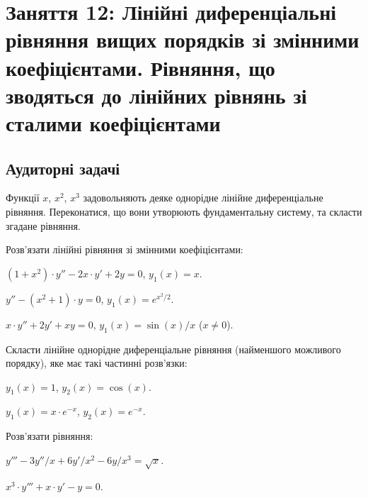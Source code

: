 \section*{Заняття 12: Лінійні диференціальні рівняння вищих порядків зі змінними коефіцієнтами. Рівняння, що зводяться до лінійних рівнянь зі сталими коефіцієнтами}

\subsection*{Аудиторні задачі}

\begin{problem}
	Функції $x$, $x^2$, $x^3$ задовольняють деяке однорідне лінійне диференціальне рівняння. Переконатися, що вони утворюють фундаментальну систему, та скласти згадане рівняння.
\end{problem}

Розв'язати лінійні рівняння зі змінними коефіцієнтами:

\begin{problem}
	$(1 + x^2) \cdot y'' - 2 x \cdot y' + 2 y = 0$, $y_1(x) = x$.
\end{problem}

\begin{problem}
	$y'' - (x^2 + 1) \cdot y = 0$, $y_1(x) = e^{x^2 / 2}$.
\end{problem}

\begin{problem}
	$x \cdot y'' + 2 y' + x y = 0$, $y_1(x) = \sin (x) / x$ ($x \ne 0$).
\end{problem}

Скласти лінійне однорідне диференціальне рівняння (найменшого можливого порядку), яке має такі частинні розв'язки:

\begin{problem}
	$y_1(x) = 1$, $y_2(x) = \cos (x)$.
\end{problem}

\begin{problem}
	$y_1(x) = x \cdot e^{-x}$, $y_2(x) = e^{-x}$.
\end{problem}

Розв'язати рівняння:

\begin{problem}
	$y''' - 3 y'' / x + 6 y' / x^2 - 6 y / x^3 = \sqrt{x}$.
\end{problem}

\begin{problem}
	$x^3 \cdot y''' + x \cdot y' - y = 0$.
\end{problem}

